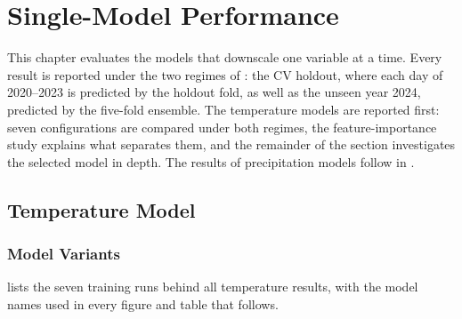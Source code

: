 
\chapter{Single-Model Performance}\label{ch:single-model}



This chapter evaluates the models that downscale one variable at a time. Every result is reported under the two regimes of : the CV holdout, where each day of 2020--2023 is predicted by the holdout fold, as well as the unseen year 2024, predicted by the five-fold ensemble. The temperature models are reported first: seven configurations are compared under both regimes, the feature-importance study explains what separates them, and the remainder of the section investigates the selected model in depth. The results of precipitation models follow in .



\section{Temperature Model}\label{sec:single-temperature}



\subsection{Model Variants}\label{subsec:single-tmax-variants}



 lists the seven training runs behind all temperature results, with the model names used in every figure and table that follows.



